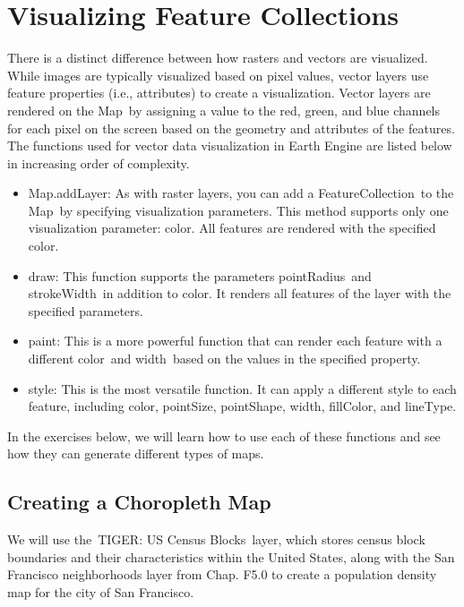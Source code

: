 \documentclass[
  letterpaper,
  DIV=11,
  numbers=noendperiod]{scrreprt}
\providecommand{\tightlist}{%
  \setlength{\itemsep}{0pt}\setlength{\parskip}{0pt}}\usepackage{longtable,booktabs,array}
\begin{document}
\hypertarget{visualizing-feature-collections}{%
\section{Visualizing Feature
Collections}\label{visualizing-feature-collections}}

There is a distinct difference between how rasters and vectors are
visualized. While images are typically visualized based on pixel values,
vector layers use feature properties (i.e., attributes) to create a
visualization. Vector layers are rendered on the Map~by assigning a
value to the red, green, and blue channels for each pixel on the screen
based on the geometry and attributes of the features. The functions used
for vector data visualization in Earth Engine are listed below in
increasing order of complexity.

\begin{itemize}
\tightlist
\item
  Map.addLayer: As with raster layers, you can add a
  FeatureCollection~to the Map~by specifying visualization parameters.
  This method supports only one visualization parameter: color. All
  features are rendered with the specified color.
\item
  draw: This function supports the parameters pointRadius~and
  strokeWidth~in addition to color. It renders all features of the layer
  with the specified parameters.
\item
  paint: This is a more powerful function that can render each feature
  with a different color~and width~based on the values in the specified
  property.
\item
  style: This is the most versatile function. It can apply a different
  style to each feature, including color, pointSize, pointShape, width,
  fillColor, and lineType.
\end{itemize}

In the exercises below, we will learn how to use each of these functions
and see how they can generate different types of maps.

\hypertarget{creating-a-choropleth-map}{%
\subsection{Creating a Choropleth Map}\label{creating-a-choropleth-map}}

We will use the~TIGER: US Census Blocks~layer, which stores census block
boundaries and their characteristics within the United States, along
with the San Francisco neighborhoods layer from Chap. F5.0 to create a
population density map for the city of San Francisco.
\end{document}
